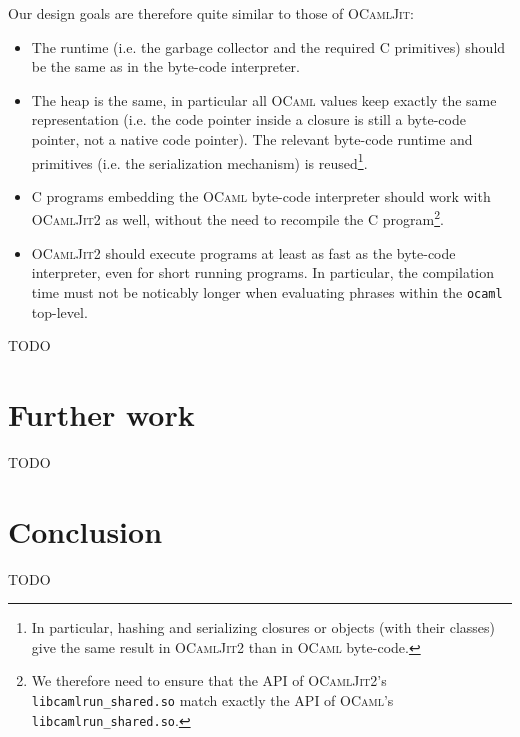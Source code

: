 \documentclass[10pt,a4paper,twocolumn]{article}
\begin{document}
Our design goals are therefore quite similar to those of \textsc{OCamlJit}:
\begin{itemize}
\item The runtime (i.e. the garbage collector and the required C primitives) should be 
  the same as in the byte-code interpreter.
\item The heap is the same, in particular all \textsc{OCaml} values keep exactly the same representation
  (i.e. the code pointer inside a closure is still a byte-code pointer, not a native code pointer). The
  relevant byte-code runtime and primitives (i.e. the serialization mechanism) is reused\footnote{In
    particular, hashing and serializing closures or objects (with their classes) give the same result
    in \textsc{OCamlJit2} than in \textsc{OCaml} byte-code.}.
\item C programs embedding the \textsc{OCaml} byte-code interpreter should work with \textsc{OCamlJit2}
  as well, without the need to recompile the C program\footnote{We therefore need to ensure that the
    API of \textsc{OCamlJit2}'s \texttt{libcamlrun\_shared.so} match exactly the API of \textsc{OCaml}'s
    \texttt{libcamlrun\_shared.so}.}.
\item \textsc{OCamlJit2} should execute programs at least as fast as the byte-code interpreter,
  even for short running programs. In particular, the compilation time must not be noticably
  longer when evaluating phrases within the \texttt{ocaml} top-level.
\end{itemize}
%
TODO


\section{Further work}

TODO


\section{Conclusion}

TODO




\end{document}
